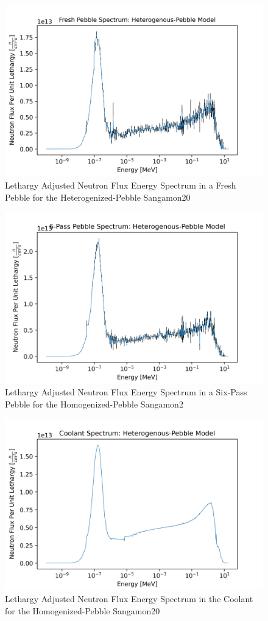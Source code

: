 \begin{figure}[H]
\centering

  \includegraphics[width=0.95\linewidth]{figures/fresh_spec_het_v2}
  \caption{Lethargy Adjusted Neutron Flux Energy Spectrum in a Fresh Pebble for the Heterogenized-Pebble Sangamon20}
  \label{fig:het-fresh}

\end{figure}

\begin{figure}[H]
\centering

  \includegraphics[width=0.95\linewidth]{figures/6_spec_het_v2}
  \caption{Lethargy Adjusted Neutron Flux Energy Spectrum in a Six-Pass Pebble for the Homogenized-Pebble Sangamon2}
  \label{fig:het-six}

\end{figure}

\begin{figure}[H]
\centering

  \includegraphics[width=0.95\linewidth]{figures/cool_spec_het_v2}
  \caption{Lethargy Adjusted Neutron Flux Energy Spectrum in the Coolant for the Homogenized-Pebble Sangamon20}
  \label{fig:het-cool}

\end{figure}